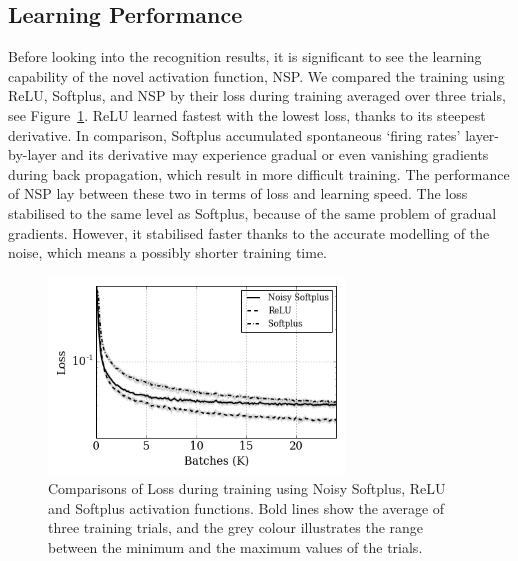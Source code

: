 	\subsection{Learning Performance}
	\label{subsec:result_compare}
	Before looking into the recognition results, it is significant to see the learning capability of the novel activation function, NSP.
	We compared the training using ReLU, Softplus, and NSP by their loss during training averaged over three trials, see Figure~\ref{Fig:loss_ns}.
	ReLU learned fastest with the lowest loss, thanks to its steepest derivative.
	In comparison, Softplus accumulated spontaneous `firing rates' layer-by-layer and its derivative may experience gradual or even vanishing gradients during back propagation, which result in more difficult training.
	The performance of NSP lay between these two in terms of loss and learning speed.
	The loss stabilised to the same level as Softplus, because of the same problem of gradual gradients.
	However, it stabilised faster thanks to the accurate modelling of the noise, which means a possibly shorter training time.
	\begin{figure}[tbp!]
		\centering
		\includegraphics[width=0.7\textwidth]{pics_iconip/8.png}
		\caption{Comparisons of Loss during training using Noisy Softplus, ReLU and Softplus activation functions. Bold lines show the average of three training trials, and the grey colour illustrates the range between the minimum and the maximum values of the trials.  }
		\label{Fig:loss_ns}
	\end{figure}

